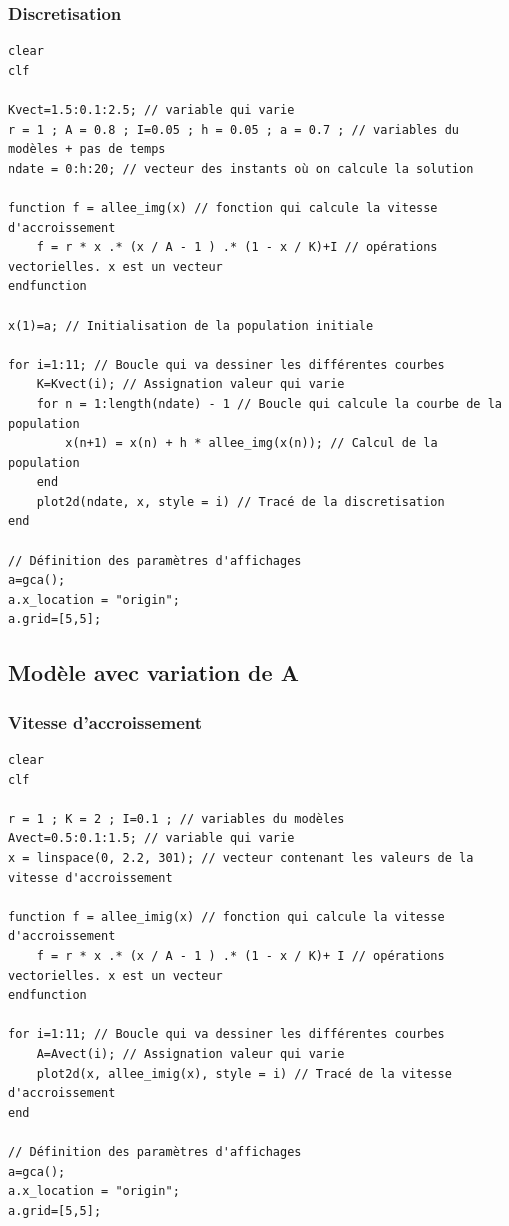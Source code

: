 \documentclass{article}
\begin{document}
\subsubsection{Discretisation}

\begin{verbatim}
clear
clf

Kvect=1.5:0.1:2.5; // variable qui varie
r = 1 ; A = 0.8 ; I=0.05 ; h = 0.05 ; a = 0.7 ; // variables du modèles + pas de temps
ndate = 0:h:20; // vecteur des instants où on calcule la solution

function f = allee_img(x) // fonction qui calcule la vitesse d'accroissement
    f = r * x .* (x / A - 1 ) .* (1 - x / K)+I // opérations vectorielles. x est un vecteur
endfunction

x(1)=a; // Initialisation de la population initiale

for i=1:11; // Boucle qui va dessiner les différentes courbes
    K=Kvect(i); // Assignation valeur qui varie
    for n = 1:length(ndate) - 1 // Boucle qui calcule la courbe de la population
        x(n+1) = x(n) + h * allee_img(x(n)); // Calcul de la population
    end 
    plot2d(ndate, x, style = i) // Tracé de la discretisation
end

// Définition des paramètres d'affichages
a=gca();
a.x_location = "origin";
a.grid=[5,5];
\end{verbatim}

\subsection{Modèle avec variation de A}

\subsubsection{Vitesse d'accroissement}

\begin{verbatim}
clear
clf

r = 1 ; K = 2 ; I=0.1 ; // variables du modèles
Avect=0.5:0.1:1.5; // variable qui varie
x = linspace(0, 2.2, 301); // vecteur contenant les valeurs de la vitesse d'accroissement

function f = allee_imig(x) // fonction qui calcule la vitesse d'accroissement
    f = r * x .* (x / A - 1 ) .* (1 - x / K)+ I // opérations vectorielles. x est un vecteur
endfunction

for i=1:11; // Boucle qui va dessiner les différentes courbes
    A=Avect(i); // Assignation valeur qui varie
    plot2d(x, allee_imig(x), style = i) // Tracé de la vitesse d'accroissement
end

// Définition des paramètres d'affichages
a=gca();
a.x_location = "origin";
a.grid=[5,5];
\end{verbatim}
\end{document}
